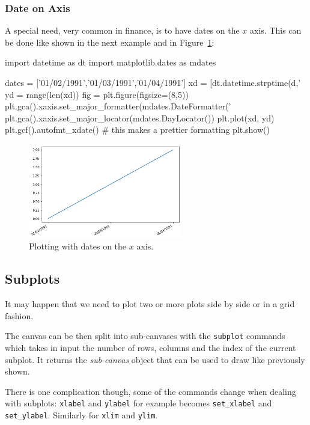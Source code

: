\subsubsection{Date on Axis}\label{date-on-axis}

A special need, very common in finance, is to have dates on the $x$ axis. This can be done like shown in the next example and in Figure~\ref{fig:axis3}:

\begin{ipython}
import datetime as dt
import matplotlib.dates as mdates

dates = ['01/02/1991','01/03/1991','01/04/1991']
xd = [dt.datetime.strptime(d,'%
yd = range(len(xd))
fig = plt.figure(figsize=(8,5))
plt.gca().xaxis.set_major_formatter(mdates.DateFormatter('%
plt.gca().xaxis.set_major_locator(mdates.DayLocator())
plt.plot(xd, yd)
plt.gcf().autofmt_xdate() # this makes a prettier formatting
plt.show()
\end{ipython}

\begin{figure}[ht]
	\centering
	\includegraphics[width=0.6\textwidth]{figures/axis3}
	\caption{Plotting with dates on the $x$ axis.}
	\label{fig:axis3}
\end{figure}

\subsection{Subplots}
\label{subplots}

It may happen that we need to plot two or more plots side by side or in a grid fashion.

The canvas can be then split into sub-canvases with the  \texttt{subplot} commands which takes in input the number of rows, columns and the index of the current subplot. It returns the \emph{sub-canvas} object that can be used to draw like previously shown.

There is one complication though, some of the commands change when
dealing with subplots: \texttt{xlabel} and \texttt{ylabel} for example becomes \texttt{set\_xlabel} and \texttt{set\_ylabel}. Similarly for \texttt{xlim} and \texttt{ylim}.

